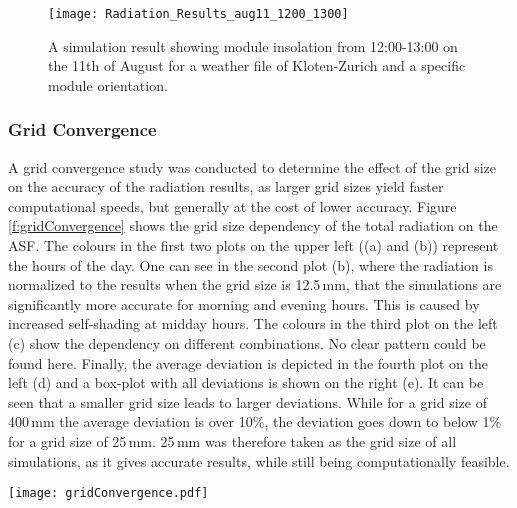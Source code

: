 			\begin{figure}[H]
			\begin{center}
				\texttt{[image: Radiation\_Results\_aug11\_1200\_1300]}
				\caption{A simulation result showing module insolation from 12:00-13:00 on the 11th of August for a weather file of Kloten-Zurich and a specific module orientation.}
				\label{fig:radiation}
			\end{center}
			\end{figure}

			\subsubsection{Grid Convergence}
			\label{ss:gridconvergence}

				A grid convergence study was conducted to determine the effect of the grid size on the accuracy of the radiation results, as larger grid sizes yield faster computational speeds, but generally at the cost of lower accuracy. Figure \ref{f:gridConvergence} shows the grid size dependency of the total radiation on the ASF. The colours in the first two plots on the upper left ((a) and (b)) represent the hours of the day. One can see in the second plot (b), where the radiation is normalized to the results when the grid size is 12.5\,mm, that the simulations are significantly more accurate for morning and evening hours. This is caused by increased self-shading at midday hours. The colours in the third plot on the left (c) show the dependency on different combinations. No clear pattern could be found here. Finally, the average deviation is depicted in the fourth plot on the left (d) and a box-plot with all deviations is shown on the right (e). It can be seen that a smaller grid size leads to larger deviations. While for a grid size of 400\,mm the average deviation is over 10\%, the deviation goes down to below 1\% for a grid size of 25\,mm. 25\,mm was therefore taken as the grid size of all simulations, as it gives accurate results, while still being computationally feasible. 

				\begin{figure*}
					\begin{center}
					\texttt{[image: gridConvergence.pdf]}
					\caption{Grid convergence evaluation, showing the deviations of the radiation in dependence of the grid size, time of the day and panel orientation. (a) shows the total radiation on the panels in dependence of the hour of the day, (b) depicts the same results, but normalized with a division of the results with the smallest grid size, (c) presents the influence of the panel orientation, (d) plots the average deviation from the smallest grid size and (e) visualises all deviations with the usage of box-plots.}
					\label{f:gridConvergence}
					\end{center}
				\end{figure*}

